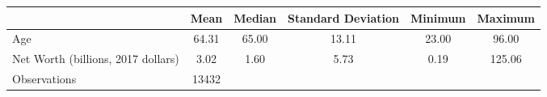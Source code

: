 {
\def\sym#1{\ifmmode^{#1}\else\(^{#1}\)\fi}
\begin{tabular}{l*{1}{ccccc}}
\hline\hline
                    &      Mean&              Median&Standard Deviation&             Minimum&   Maximum\\
\hline
Age                 &     64.31&               65.00&     13.11&               23.00&     96.00\\
Net Worth (billions, 2017 dollars)&      3.02&                1.60&      5.73&                0.19&    125.06\\
\hline
Observations        &     13432&                    &          &                    &          \\
\hline\hline
\end{tabular}
}
